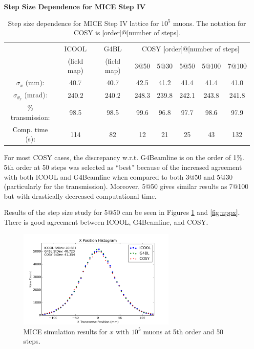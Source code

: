 \begin{table}
\caption*{\textbf{Step Size Dependence for MICE Step IV}}
\begin{center}
\begin{tabularx}{\textwidth}{cccccccc}
\hline \hline
& ICOOL & G4BL & \multicolumn{5}{c}{COSY [order]@[number of steps]}\vspace{-12pt}\\
& (field map) & (field map) & 3@50 & 5@30 & 5@50 & 5@100 & 7@100\\
\hline
$\sigma_x$ (mm): & 40.7 & 40.7 & 42.5 & 41.2 & 41.4 & 41.4 & 41.0\\
$\sigma_{\theta_x}$ (mrad): & 240.2 & 240.2 & 248.3 & 239.8 & 242.1 & 243.8 & 241.8\\
\% transmission: & 98.5 & 98.5 & 99.6 & 96.8 & 97.7 & 98.6 & 97.9\\
Comp. time (s): & 114 & 82 & 12 & 21 & 25 & 43 & 132\\
\hline
\end{tabularx}
\end{center}
\caption[Step size dependence for MICE Step IV lattice.]{Step size dependence for MICE Step IV lattice for $10^5$ muons. The notation for COSY is [order]@[number of steps].}
\label{tbl:mice_step_size_upstream}
\end{table}

For most COSY cases, the discrepancy w.r.t. G4Beamline is on the order of 1\%. 5th order at 50 steps was selected as ``best'' because of the increased agreement with both ICOOL and G4Beamline when compared to both 3@50 and 5@30 (particularly for the transmission). Moreover, 5@50 gives similar results as 7@100 but with drastically decreased computational time. 

Results of the step size study for 5@50 can be seen in Figures \ref{fig:upx} and \ref{fig:uppx}. There is good agreement between ICOOL, G4Beamline, and COSY.

\begin{figure}[H]
  \centering
    \includegraphics[width=0.7\textwidth]{MICE data/upstream/x} 
  \caption{MICE simulation results for $x$ with $10^5$ muons at 5th order and 50 steps.}
  \label{fig:upx}
\end{figure}

